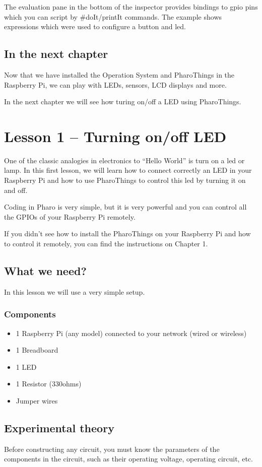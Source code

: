 \documentclass[10pt,twoside,english]{_support/latex/sbabook/sbabook}
\begin{document}
The evaluation pane in the bottom of the inspector provides bindings to gpio pins which you can script by \#doIt/printIt commands. The example shows expressions which were used to configure a button and led.
\section{In the next chapter}
Now that we have installed the Operation System and PharoThings in the Raspberry Pi, we can play with LEDs, sensors, LCD displays and more. 

In the next chapter we will see how turing on/off a LED using PharoThings. 
\chapter{Lesson 1 – Turning on/off LED }
One of the classic analogies in electronics to “Hello World” is turn on a led or lamp. In this first lesson, we will learn how to connect correctly an LED in your Raspberry Pi and how to use PharoThings to control this led by turning it on and off.

Coding in Pharo is very simple, but it is very powerful and you can control all the GPIOs of your Raspberry Pi remotely.

If you didn’t see how to install the PharoThings on your Raspberry Pi and how to control it remotely, you can find the instructions on Chapter 1.
\section{What we need?}
In this lesson we will use a very simple setup.
\subsection{Components}
\begin{itemize}
\item 1 Raspberry Pi (any model) connected to your network (wired or wireless)
\item 1 Breadboard
\item 1 LED
\item 1 Resistor (330ohms)
\item Jumper wires
\end{itemize}
\section{Experimental theory}
Before constructing any circuit, you must know the parameters of the components in the circuit, such as their operating voltage, operating circuit, etc.
\end{document}
